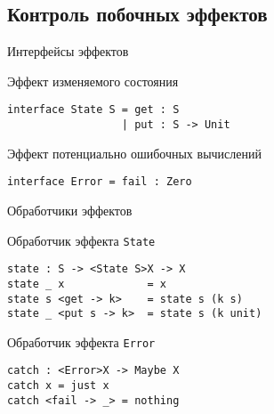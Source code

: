 
\subsection{Контроль побочных эффектов}

\begin{frame}[fragile]{Интерфейсы эффектов}
\begin{block}{Эффект изменяемого состояния}
\begin{verbatim}
interface State S = get : S
                  | put : S -> Unit
\end{verbatim}
\end{block}
\begin{block}{Эффект потенциально ошибочных вычислений}
\begin{verbatim}
interface Error = fail : Zero
\end{verbatim}
\end{block}
\end{frame}

\begin{frame}[fragile]{Обработчики эффектов}
\begin{block}{Обработчик эффекта \texttt{State}}
\begin{verbatim}
state : S -> <State S>X -> X
state _ x             = x
state s <get -> k>    = state s (k s)
state _ <put s -> k>  = state s (k unit)
\end{verbatim}
\end{block}
\begin{block}{Обработчик эффекта \texttt{Error}}
\begin{verbatim}
catch : <Error>X -> Maybe X
catch x = just x
catch <fail -> _> = nothing
\end{verbatim}
\end{block}
\end{frame}



